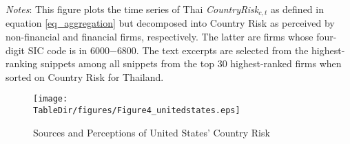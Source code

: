 \documentclass[12pt,oneside,leqno]{article}
\newcommand*{\TableDir}{.}
\begin{document}
\begin{minipage}[t]{.98\textwidth}
\scriptsize\textit{Notes}: This figure plots the time series of Thai \textit{CountryRisk}$_{c,t}$ as defined in equation \eqref{eq_aggregation} but decomposed into Country Risk as perceived by non-financial and financial firms, respectively. The latter are firms whose four-digit SIC code is in 6000$-$6800. The text excerpts are selected from the highest-ranking snippets among all snippets from the top 30 highest-ranked firms when sorted on Country Risk for Thailand.
\end{minipage}


\clearpage
\begin{figure}[!h]
\centering\caption{Sources and Perceptions of United States' Country Risk}\label{fig:USA}
\texttt{[image: \\TableDir/figures/Figure4\_unitedstates.eps]}
\end{figure}
\vspace{-0.1in}
\end{document}
